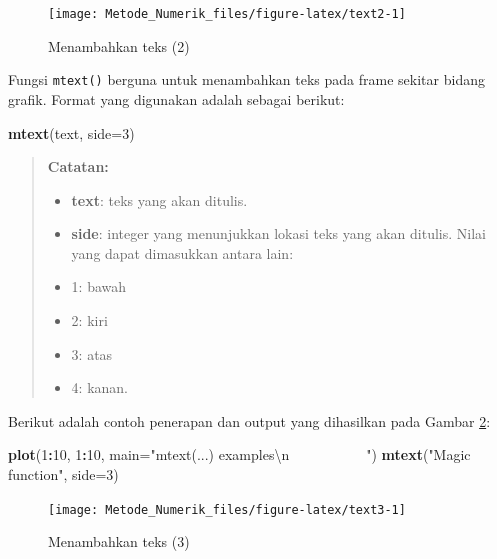 \documentclass[]{book}
\newenvironment{Shaded}{\begin{snugshade}}{\end{snugshade}}
\newcommand{\CharTok}[1]{\textcolor[rgb]{0.31,0.60,0.02}{#1}}
\newcommand{\DataTypeTok}[1]{\textcolor[rgb]{0.13,0.29,0.53}{#1}}
\newcommand{\DecValTok}[1]{\textcolor[rgb]{0.00,0.00,0.81}{#1}}
\newcommand{\KeywordTok}[1]{\textcolor[rgb]{0.13,0.29,0.53}{\textbf{#1}}}
\newcommand{\NormalTok}[1]{#1}
\newcommand{\OperatorTok}[1]{\textcolor[rgb]{0.81,0.36,0.00}{\textbf{#1}}}
\newcommand{\StringTok}[1]{\textcolor[rgb]{0.31,0.60,0.02}{#1}}
\providecommand{\tightlist}{%
  \setlength{\itemsep}{0pt}\setlength{\parskip}{0pt}}
\theoremstyle{definition}
\theoremstyle{definition}
\theoremstyle{definition}
\theoremstyle{remark}
\begin{document}
\begin{figure}

{\centering \texttt{[image: Metode\_Numerik\_files/figure-latex/text2-1]} 

}

\caption{Menambahkan teks (2)}\label{fig:text2}
\end{figure}

Fungsi \texttt{mtext()} berguna untuk menambahkan teks pada frame sekitar bidang grafik. Format yang digunakan adalah sebagai berikut:

\begin{Shaded}
\begin{Highlighting}[]
\KeywordTok{mtext}\NormalTok{(text, }\DataTypeTok{side=}\DecValTok{3}\NormalTok{)}
\end{Highlighting}
\end{Shaded}

\begin{quote}
\textbf{Catatan:}

\begin{itemize}
\tightlist
\item
  \textbf{text}: teks yang akan ditulis.
\item
  \textbf{side}: integer yang menunjukkan lokasi teks yang akan ditulis. Nilai yang dapat dimasukkan antara lain:
\item
  1: bawah
\item
  2: kiri
\item
  3: atas
\item
  4: kanan.
\end{itemize}
\end{quote}

Berikut adalah contoh penerapan dan output yang dihasilkan pada Gambar \ref{fig:text3}:

\begin{Shaded}
\begin{Highlighting}[]
\KeywordTok{plot}\NormalTok{(}\DecValTok{1}\OperatorTok{:}\DecValTok{10}\NormalTok{, }\DecValTok{1}\OperatorTok{:}\DecValTok{10}\NormalTok{, }
     \DataTypeTok{main=}\StringTok{"mtext(...) examples}\CharTok{\textbackslash{}n}\StringTok{~~~~~~~~~~~"}\NormalTok{)}
\KeywordTok{mtext}\NormalTok{(}\StringTok{"Magic function"}\NormalTok{, }\DataTypeTok{side=}\DecValTok{3}\NormalTok{)}
\end{Highlighting}
\end{Shaded}

\begin{figure}

{\centering \texttt{[image: Metode\_Numerik\_files/figure-latex/text3-1]} 

}

\caption{Menambahkan teks (3)}\label{fig:text3}
\end{figure}
\end{document}
